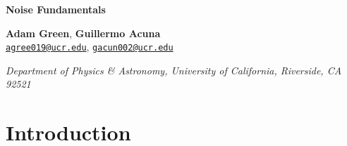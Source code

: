 \documentclass[12pt]{article}
\newcommand{\email}[1]{\href{mailto:#1}{\textcolor{mygreen1}{#1}}}
\newenvironment{institutions}[1][2em]{\begin{list}{}{\setlength\leftmargin{#1}\setlength\rightmargin{#1}}\item[]}{\end{list}}
\begin{document}
	\begin{center}
		
		{\LARGE \bf Noise Fundamentals}\\
		
		\vspace{0.5cm}
		
		\textbf{Adam Green}, \textbf{Guillermo Acuna}\\
		
		\texttt{\footnotesize \email{agree019@ucr.edu}},
		\texttt{\footnotesize \email{gacun002@ucr.edu}}
		
		\vspace{0.5cm}
		
		
		\begin{institutions}[2.25cm]
			\footnotesize
			{\it 
				Department of Physics \& Astronomy, 
				University of  California, Riverside, 
				CA 92521	    
			}    
		\end{institutions}
		
		\vspace{0.5cm}
	\end{center}

	\vspace{0.5cm}
	
	\begin{abstract}
		In this experiment we utilize Johnson and shot noise to measure Boltzmann's constant and the fundamental electric charge. For Johnson noise, we find that the data obeys Nyquist's theorem and we measure the power spectral density against resistance and temperature. From these measurements we extract Boltzmann's constant to be $3.27\times 10^{-23} \ \pm 9.96 \times 10^{-25} \ \text{J}\cdot \text{s}$. For shot noise, we measure the power spectral density against bandwidth and photodiode current. Similarly, we find that the data obeys the linear relationship predicted by Schottky's theorem. From this, we extract the fundamental electric charge to be $3.18\times 10^{-19} \ \pm 3.89 \times 10^{-20}$ C.
	\end{abstract}
	
	\tableofcontents

	\pagebreak

	\section{Introduction}
	
\end{document}
